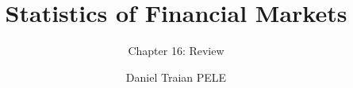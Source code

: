 \title[Statistics of Financial Markets]{Statistics of Financial Markets}
\subtitle{Chapter 16: Review}
\author[D.T. Pele]{Daniel Traian PELE}
\date{}

\providecommand{\sfmapplink}[3]{\hypertarget{#2}{}\hyperlink{#1}{\beamergotobutton{#3}}}  %
\providecommand{\sfmappback}[2]{\begin{tikzpicture}[remember picture,overlay]\node[anchor=south east] at ([xshift=-3mm,yshift=7mm]current page.south east){\hyperlink{#1}{\beamerreturnbutton{#2}}};\end{tikzpicture}}  %
\providecommand{\sfmchlink}[2]{\href{#1}{#2}}  %
\providecommand{\sfmchlinkt}[2]{\href{#1}{\usebeamercolor[fg]{frametitle}#2}}  %


